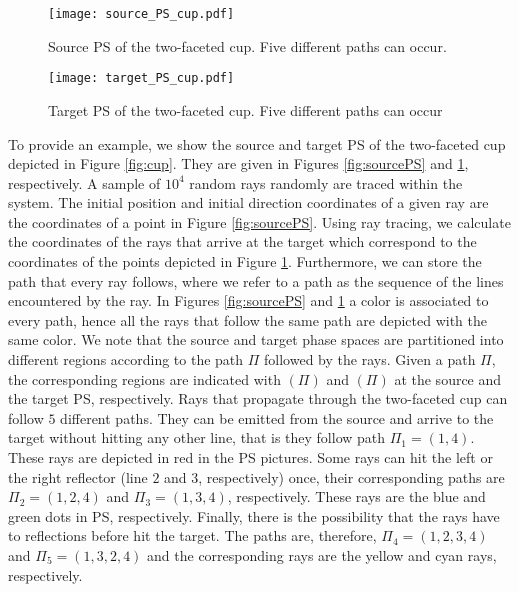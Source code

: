 \begin{figure}[h]
  \begin{minipage}[]{0.49\textwidth}
\centering
    \texttt{[image: source\_PS\_cup.pdf]}
    \caption{Source PS of the two-faceted cup. Five different paths can occur.}
    \label{fig:sourcePS}
  \end{minipage}
\hspace{0.2cm}
  \begin{minipage}[]{0.49\textwidth}
\centering
    \texttt{[image: target\_PS\_cup.pdf]}
  \caption{Target PS of the two-faceted cup. Five different paths can occur}
   \label{fig:targetPS}
 \end{minipage}
\end{figure}
To provide an example, we show the source and target PS of the two-faceted cup depicted in Figure \ref{fig:cup}.
They are given in Figures \ref{fig:sourcePS} and \ref{fig:targetPS}, respectively.
A sample of $10^4$ random rays randomly are traced within the system. The initial position and initial direction coordinates of a given ray are the coordinates of a point in
Figure \ref{fig:sourcePS}.
Using ray tracing, we calculate the coordinates of the rays that arrive at the target which correspond
to the coordinates of the points depicted in Figure \ref{fig:targetPS}.
Furthermore, we can store the path that every ray follows, where we refer to a path as the sequence of the lines encountered by the ray.
In Figures \ref{fig:sourcePS} and \ref{fig:targetPS} a color is associated to every path, hence all the rays that follow the same path are depicted with the same color.
We note that the source and target phase spaces are partitioned into different regions according to the path $\Pi$ followed by the rays.
Given a path $\Pi$, the corresponding regions are indicated with $(\Pi)$ and $(\Pi)$ at the source and the target PS, respectively.
Rays that propagate through the two-faceted cup can follow $5$ different paths. They can be emitted from the source and arrive to the target without hitting any other line, that is they follow path $\Pi_1= (1,4)$. These rays are depicted in red in the PS pictures. Some rays can hit the left or the right reflector (line $2$ and $3$, respectively) once, their corresponding paths are $\Pi_2 = (1,2,4)$ and $\Pi_3 = (1,3,4)$, respectively. These rays are the blue and green dots in PS, respectively. Finally, there is the possibility that the rays have to reflections before hit the target. The paths are, therefore, $\Pi_4 = (1,2,3,4)$ and $\Pi_5 = (1,3,2,4)$ and the corresponding rays are the yellow and cyan rays, respectively.
